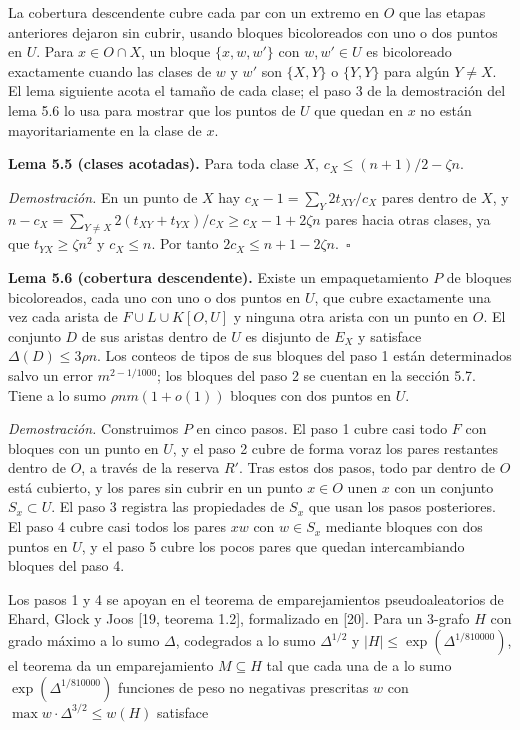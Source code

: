 \documentclass[spanish,11pt,a4paper]{article}
\begin{document}
La cobertura descendente cubre cada par con un extremo en \(O\) que las etapas anteriores dejaron sin cubrir, usando bloques bicoloreados con uno o dos puntos en \(U\). Para \(x\in O\cap X\), un bloque \(\{x,w,w'\}\) con \(w,w'\in U\) es bicoloreado exactamente cuando las clases de \(w\) y \(w'\) son \(\{X,Y\}\) o \(\{Y,Y\}\) para algún \(Y\ne X\). El lema siguiente acota el tamaño de cada clase; el paso 3 de la demostración del lema 5.6 lo usa para mostrar que los puntos de \(U\) que quedan en \(x\) no están mayoritariamente en la clase de \(x\).

\textbf{Lema 5.5 (clases acotadas).} Para toda clase \(X\), \(c_X\le(n+1)/2-\zeta n\).

\emph{Demostración.} En un punto de \(X\) hay \(c_X-1=\sum_Y2t_{XY}/c_X\) pares dentro de \(X\), y \(n-c_X=\sum_{Y\ne X}2(t_{XY}+t_{YX})/c_X\ge c_X-1+2\zeta n\) pares hacia otras clases, ya que \(t_{YX}\ge\zeta n^2\) y \(c_X\le n\). Por tanto \(2c_X\le n+1-2\zeta n\).~\(\square\)

\textbf{Lema 5.6 (cobertura descendente).} Existe un empaquetamiento \(P\) de bloques bicoloreados, cada uno con uno o dos puntos en \(U\), que cubre exactamente una vez cada arista de \(F\cup L\cup K[O,U]\) y ninguna otra arista con un punto en \(O\). El conjunto \(D\) de sus aristas dentro de \(U\) es disjunto de \(E_X\) y satisface \(\Delta(D)\le3\rho n\). Los conteos de tipos de sus bloques del paso 1 están determinados salvo un error \(m^{2-1/1000}\); los bloques del paso 2 se cuentan en la sección 5.7. Tiene a lo sumo \(\rho nm(1+o(1))\) bloques con dos puntos en \(U\).

\emph{Demostración.} Construimos \(P\) en cinco pasos. El paso 1 cubre casi todo \(F\) con bloques con un punto en \(U\), y el paso 2 cubre de forma voraz los pares restantes dentro de \(O\), a través de la reserva \(R'\). Tras estos dos pasos, todo par dentro de \(O\) está cubierto, y los pares sin cubrir en un punto \(x\in O\) unen \(x\) con un conjunto \(S_x\subset U\). El paso 3 registra las propiedades de \(S_x\) que usan los pasos posteriores. El paso 4 cubre casi todos los pares \(xw\) con \(w\in S_x\) mediante bloques con dos puntos en \(U\), y el paso 5 cubre los pocos pares que quedan intercambiando bloques del paso 4.

Los pasos 1 y 4 se apoyan en el teorema de emparejamientos pseudoaleatorios de Ehard, Glock y Joos {[}19, teorema 1.2{]}, formalizado en {[}20{]}. Para un 3-grafo \(H\) con grado máximo a lo sumo \(\Delta\), codegrados a lo sumo \(\Delta^{1/2}\) y \(|H|\le\exp(\Delta^{1/810000})\), el teorema da un emparejamiento \(M\subseteq H\) tal que cada una de a lo sumo \(\exp(\Delta^{1/810000})\) funciones de peso no negativas prescritas \(w\) con \(\max w\cdot\Delta^{3/2}\le w(H)\) satisface
\end{document}
